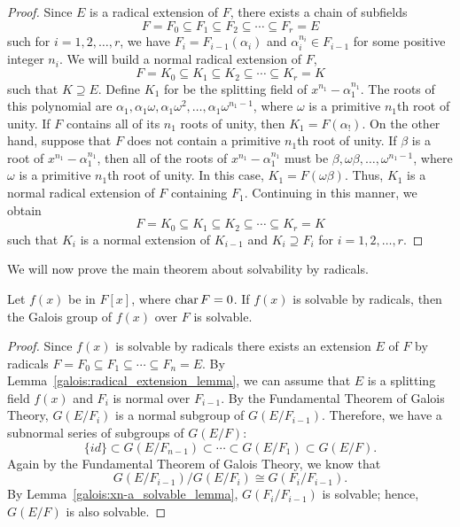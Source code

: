  
\begin{proof}
Since $E$ is a radical extension of $F$,  there exists a chain of subfields
\[
F = F_0 \subseteq F_1 \subseteq F_2 \subseteq \cdots \subseteq F_r = E
\]
such for $i = 1, 2, \ldots, r$, we have  $F_i = F_{i - 1}(\alpha_i)$ and $\alpha_i^{n_i} \in F_{i-1}$ for some positive integer $n_i$.  We will build a normal radical extension of $F$,
\[
F = K_0 \subseteq K_1 \subseteq K_2 \subseteq \cdots \subseteq K_r = K
\]
such that $K \supseteq E$.  Define $K_1$ for be the splitting field of $x^{n_1} - \alpha_1^{n_1}$.  The roots of this polynomial are $\alpha_1, \alpha_1 \omega, \alpha_1 \omega^2, \ldots, \alpha_1 \omega^{n_1 - 1}$, where $\omega$ is a primitive  $n_1$th root of unity.  If $F$ contains all of its $n_1$ roots of unity, then  $K_1 = F(\alpha_!)$.   On the other hand, suppose that $F$ does not contain a primitive $n_1$th root of unity.  If $\beta$ is a root of  $x^{n_1} - \alpha_1^{n_1}$, then all of the roots of  $x^{n_1} - \alpha_1^{n_1}$ must be $\beta, \omega \beta, \ldots, \omega^{n_1-1}$, where  $\omega$ is a primitive  $n_1$th root of unity. In this case, $K_1 = F(\omega \beta)$.  Thus, $K_1$ is a normal radical extension of $F$ containing $F_1$.  
Continuing in this manner, we obtain
\[
F = K_0 \subseteq K_1 \subseteq K_2 \subseteq \cdots \subseteq K_r = K
\]
such that $K_i$ is a normal extension of $K_{i-1}$ and $K_i \supseteq F_i$ for $i = 1, 2, \ldots, r$.
\hspace*{0.5in}
\end{proof}






\medskip


We will now prove the main theorem about solvability by radicals.
 
 
\begin{theorem}\label{galois:solvable_by_radicals_theorem}
Let $f(x)$ be in $F[x]$, where $\operatorname{char} F = 0$. If $f(x)$ is
solvable by radicals, then the Galois group of $f(x)$ over $F$ is 
solvable.
\end{theorem}
 
 
\begin{proof}
Since $f(x)$ is
solvable by radicals there exists an extension $E$ of $F$ by radicals $F = F_0 \subseteq
F_1 \subseteq \cdots \subseteq F_n = E$. By  Lemma~\ref{galois:radical_extension_lemma}, we can assume that $E$ is a splitting field $f(x)$ and   $F_i$ is normal over $F_{i-1}$.  By
the Fundamental Theorem of Galois Theory, $G(E/F_i)$ is a normal
subgroup of $G(E/F_{i-1})$.  Therefore, we have a subnormal series of
subgroups of $G(E/F)$:  
\[
\{ id \} \subset G(E/F_{n-1}) \subset \cdots \subset G(E/F_1) \subset
G(E/F).
\]
Again by the Fundamental Theorem of Galois Theory, we know that
\[
G(E/F_{i-1})/G(E/F_i) \cong G(F_i/F_{i-1}).
\]
By Lemma~\ref{galois:xn-a_solvable_lemma}, $G(F_i/F_{i-1})$ is solvable; hence, $G(E/F)$ is also
solvable. 
\mbox{\hspace{1in}}
\end{proof}


